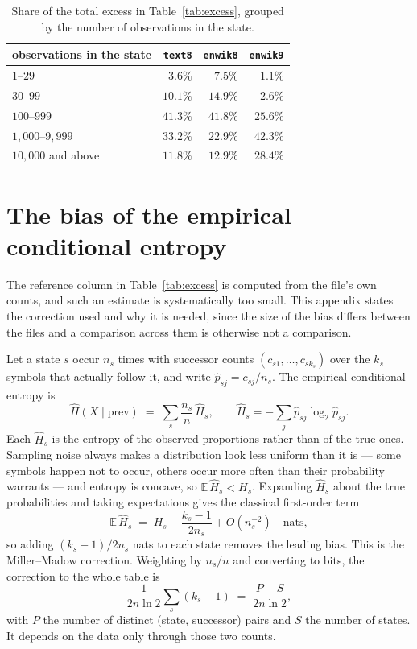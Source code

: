 \documentclass[11pt]{article}
\begin{document}
\begin{table}[ht]
\centering
\begin{tabular}{lrrr}
\toprule
observations in the state & \texttt{text8} & \texttt{enwik8} & \texttt{enwik9} \\
\midrule
$1$--$29$             & $3.6\%$  & $7.5\%$  & $1.1\%$ \\
$30$--$99$            & $10.1\%$ & $14.9\%$ & $2.6\%$ \\
$100$--$999$          & $41.3\%$ & $41.8\%$ & $25.6\%$ \\
$1{,}000$--$9{,}999$ & $33.2\%$ & $22.9\%$ & $42.3\%$ \\
$10{,}000$ and above  & $11.8\%$ & $12.9\%$ & $28.4\%$ \\
\bottomrule
\end{tabular}
\caption{Share of the total excess in Table~\ref{tab:excess}, grouped by
  the number of observations in the state.}
\label{tab:excess-where}
\end{table}

\section{The bias of the empirical conditional entropy}
\label{app:mm}

The reference column in Table~\ref{tab:excess} is computed from the file's own
counts, and such an estimate is systematically too small.  This
appendix states the correction used and why it is needed, since the
size of the bias differs between the files and a comparison across
them is otherwise not a comparison.

Let a state $s$ occur $n_s$ times with successor counts
$(c_{s1},\dots,c_{sk_s})$ over the $k_s$ symbols that actually follow
it, and write $\hat p_{sj} = c_{sj}/n_s$.  The empirical conditional
entropy is
\[
  \hat H(X \mid \text{prev})
  \;=\; \sum_s \frac{n_s}{n} \, \hat H_s ,
  \qquad
  \hat H_s = -\sum_{j} \hat p_{sj} \log_2 \hat p_{sj} .
\]
Each $\hat H_s$ is the entropy of the observed proportions rather than
of the true ones.  Sampling noise always makes a distribution look
less uniform than it is --- some symbols happen not to occur, others
occur more often than their probability warrants --- and entropy is
concave, so $\mathbb{E}\,\hat H_s < H_s$.  Expanding $\hat H_s$ about
the true probabilities and taking expectations gives the classical
first-order term
\[
  \mathbb{E}\,\hat H_s \;=\; H_s - \frac{k_s - 1}{2 n_s} + O(n_s^{-2})
  \quad \text{nats},
\]
so adding $(k_s-1)/2n_s$ nats to each state removes the leading bias.
This is the Miller--Madow correction.  Weighting by $n_s/n$ and
converting to bits, the correction to the whole table is
\[
  \frac{1}{2 n \ln 2} \sum_s (k_s - 1)
  \;=\; \frac{P - S}{2 n \ln 2},
\]
with $P$ the number of distinct (state, successor) pairs and $S$ the
number of states.  It depends on the data only through those two
counts.
\end{document}
